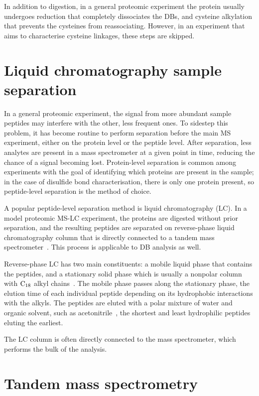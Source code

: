 In addition to digestion, in a general proteomic experiment the protein usually undergoes reduction that completely dissociates the DBs, and cysteine alkylation that prevents the cysteines from reassociating. However, in an experiment that aims to characterise cysteine linkages, these steps are skipped.

\section{Liquid chromatography sample separation}\label{sec:lc}

In a general proteomic experiment, the signal from more abundant sample peptides may interfere with the other, less frequent ones. To sidestep this problem, it has become routine to perform separation before the main MS experiment, either on the protein level or the peptide level. After separation, less analytes are present in a mass spectrometer at a given point in time, reducing the chance of a signal becoming lost. Protein-level separation is common among experiments with the goal of identifying which proteins are present in the sample; in the case of disulfide bond characterisation, there is only one protein present, so peptide-level separation is the method of choice.

A popular peptide-level separation method is liquid chromatography (LC). In a model proteomic MS-LC experiment, the proteins are digested without prior separation, and the resulting peptides are separated on reverse-phase liquid chromatography column that is directly connected to a tandem mass spectrometer~\cite{washburn2001large}. This process is applicable to DB analysis as well.

Reverse-phase LC has two main constituents: a mobile liquid phase that contains the peptides, and a stationary solid phase which is usually a nonpolar column with \(\ce{C18}\) alkyl chains~\cite{chang1976high}. The mobile phase passes along the stationary phase, the elution time of each individual peptide depending on its hydrophobic interactions with the alkyls. The peptides are eluted with a polar mixture of water and organic solvent, such as acetonitrile~\cite{frohlich2006proteome}, the shortest and least hydrophilic peptides eluting the earliest.

The LC column is often directly connected to the mass spectrometer, which performs the bulk of the analysis.


\section{Tandem mass spectrometry}\label{sec:msms}

